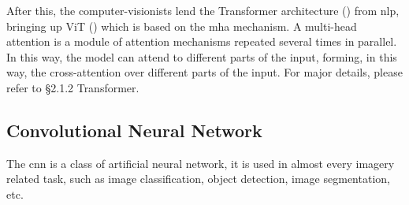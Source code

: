 After this, the computer-visionists lend the Transformer architecture (\cite{transformer_paper}) from \gls{nlp}, bringing up ViT (\cite{vit_paper}) which is based on the \gls{mha} mechanism.
A multi-head attention is a module of attention mechanisms repeated several times in parallel.
In this way, the model can attend to different parts of the input, forming, in this way, the cross-attention over different parts of the input.
For major details, please refer to \S2.1.2 Transformer.


\subsection{Convolutional Neural Network}\label{subsec:conv-neural-network}
The \gls{cnn} is a class of artificial neural network, it is used in almost every imagery related task, such as image classification, object detection, image segmentation, etc.

